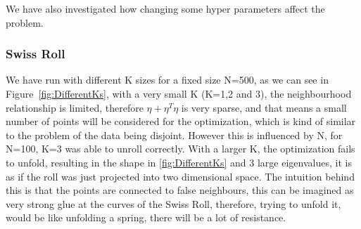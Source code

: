 \documentclass[a4paper,12pt]{article}
\begin{document}
We have also investigated how changing some hyper parameters affect the problem.
\subsubsection{Swiss Roll}
We have run with different K sizes for a fixed size N=500, as we can see in Figure~\ref{fig:DifferentKs}, with a very small K (K=1,2 and 3), the neighbourhood relationship is limited, therefore $\eta + \eta^T\eta$ is very sparse, and that means a small number of points will be considered for the optimization, which is kind of similar to the problem of the data being disjoint. However this is influenced by N, for N=100, K=3 was able to unroll correctly.
With a larger K, the optimization fails to unfold, resulting in the shape in \ref{fig:DifferentKs} and 3 large eigenvalues, it is as if the roll was just projected into two dimensional space. The intuition behind this is that the points are connected to false neighbours, this can be imagined as very strong glue at the curves of the Swiss Roll, therefore, trying to unfold it, would be like unfolding a spring, there will be a lot of resistance.
\end{document}
